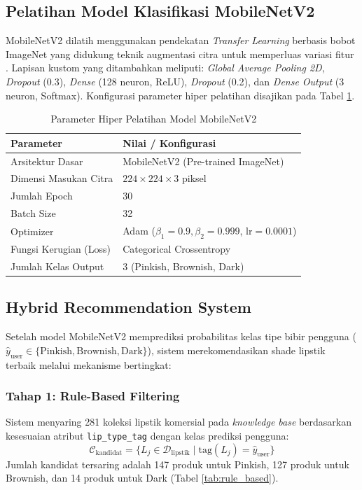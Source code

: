 \documentclass[10pt,a4paper]{article}
\begin{document}
\subsection{Pelatihan Model Klasifikasi MobileNetV2}
MobileNetV2 dilatih menggunakan pendekatan \textit{Transfer Learning} berbasis bobot ImageNet \cite{pan2010survey, he2016deep} yang didukung teknik augmentasi citra untuk memperluas variasi fitur \cite{shorten2019survey}. Lapisan kustom yang ditambahkan meliputi: \textit{Global Average Pooling 2D}, \textit{Dropout} (0.3), \textit{Dense} (128 neuron, ReLU), \textit{Dropout} (0.2), dan \textit{Dense Output} (3 neuron, Softmax). Konfigurasi parameter hiper pelatihan disajikan pada Tabel \ref{tab:param_pelatihan}.

\begin{table}[htbp]
  \centering
  \caption{Parameter Hiper Pelatihan Model MobileNetV2}
  \label{tab:param_pelatihan}
  \fontsize{8.5pt}{11pt}\selectfont
  \begin{tabular}{ll}
    \toprule
    \textbf{Parameter} & \textbf{Nilai / Konfigurasi} \\
    \midrule
    Arsitektur Dasar & MobileNetV2 (Pre-trained ImageNet) \\
    Dimensi Masukan Citra & $224 \times 224 \times 3$ piksel \\
    Jumlah Epoch & 30 \\
    Batch Size & 32 \\
    Optimizer & Adam ($\beta_1=0.9, \beta_2=0.999$, $\text{lr}=0.0001$) \\
    Fungsi Kerugian (Loss) & Categorical Crossentropy \\
    Jumlah Kelas Output & 3 (Pinkish, Brownish, Dark) \\
    \bottomrule
  \end{tabular}
\end{table}

\subsection{Hybrid Recommendation System}
Setelah model MobileNetV2 memprediksi probabilitas kelas tipe bibir pengguna ($\hat{y}_{\text{user}} \in \{\text{Pinkish}, \text{Brownish}, \text{Dark}\}$), sistem merekomendasikan shade lipstik terbaik melalui mekanisme bertingkat:

\subsubsection{Tahap 1: Rule-Based Filtering}
Sistem menyaring 281 koleksi lipstik komersial pada \textit{knowledge base} berdasarkan kesesuaian atribut \texttt{lip\_type\_tag} dengan kelas prediksi pengguna:
\begin{equation}
  \mathcal{C}_{\text{kandidat}} = \{ L_j \in \mathcal{D}_{\text{lipstik}} \mid \text{tag}(L_j) = \hat{y}_{\text{user}} \}
\end{equation}
Jumlah kandidat tersaring adalah 147 produk untuk Pinkish, 127 produk untuk Brownish, dan 14 produk untuk Dark (Tabel \ref{tab:rule_based}).
\end{document}
